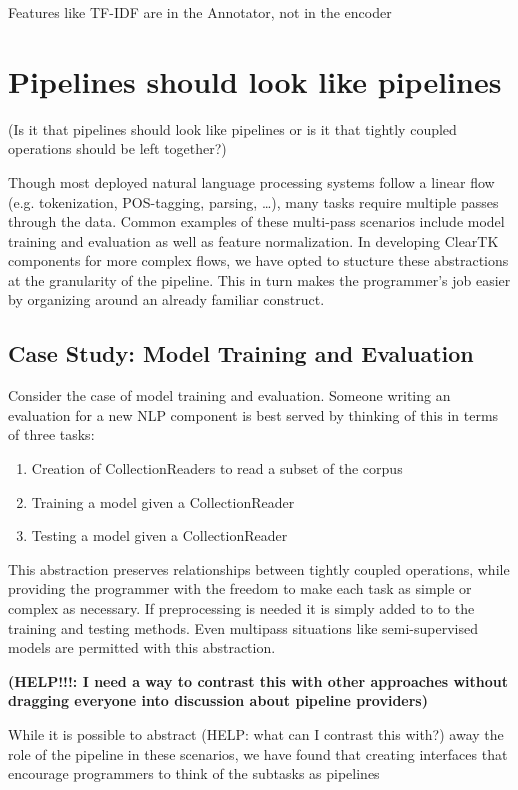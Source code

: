\documentclass[10pt, a4paper]{article}
\begin{document}
Features like TF-IDF are in the Annotator, not in the encoder


\section{Pipelines should look like pipelines}

(Is it that pipelines should look like pipelines or is it that tightly coupled operations should be left together?)

Though most deployed natural language processing systems follow a linear flow (e.g. tokenization, POS-tagging, parsing, \ldots), many tasks require multiple passes through the data.  Common examples of these multi-pass scenarios include model training and evaluation as well as feature normalization.  In developing ClearTK components for more complex flows, we have opted to stucture these abstractions at the granularity of the pipeline.  This in turn makes the programmer's job easier by organizing around an already familiar construct.

\subsection{Case Study: Model Training and Evaluation}
Consider the case of model training and evaluation.  Someone writing an evaluation for a new NLP component is best served by thinking of this in terms of three tasks:

\begin{enumerate}
\item Creation of CollectionReaders to read a subset of the corpus
\item Training a model given a CollectionReader
\item Testing a model given a CollectionReader
\end{enumerate}

This abstraction preserves relationships between tightly coupled operations, while providing the programmer with the freedom to make each task as simple or complex as necessary.  If preprocessing is needed it is simply added to to the training and testing methods.  Even multipass situations like semi-supervised models are permitted with this abstraction.



\textbf{(HELP!!!: I need a way to contrast this with other approaches without dragging everyone into discussion about pipeline providers)}


While it is possible to abstract (HELP: what can I contrast this with?) away the role of the pipeline in these scenarios, we have found that creating interfaces that encourage programmers to think of the subtasks as pipelines
\end{document}
